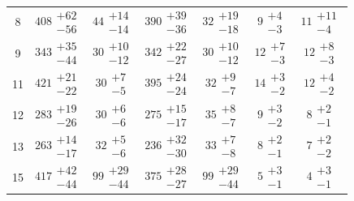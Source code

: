 \begin{table}[htbp!]
\begin{center}
\begin{tabular}{ccccccc}
8 & $ 408 \substack{+ 62 \\ -56 }$ &$ 44 \substack{+ 14 \\- 14 }$ &$ 390 \substack{+ 39 \\- 36 }$ &$ 32 \substack{+ 19 \\- 18 }$ &$ 9 \substack{+ 4 \\- 3 }$ &$ 11 \substack{+ 11 \\- 4 }$ \\
9 & $ 343 \substack{+ 35 \\ -44 }$ &$ 30 \substack{+ 10 \\- 12 }$ &$ 342 \substack{+ 22 \\- 27 }$ &$ 30 \substack{+ 10 \\- 12 }$ &$ 12 \substack{+ 7 \\- 3 }$ &$ 12 \substack{+ 8 \\- 3 }$ \\
11 & $ 421 \substack{+ 21 \\ -22 }$ &$ 30 \substack{+ 7 \\- 5 }$ &$ 395 \substack{+ 24 \\- 24 }$ &$ 32 \substack{+ 9 \\- 7 }$ &$ 14 \substack{+ 3 \\- 2 }$ &$ 12 \substack{+ 4 \\- 2 }$ \\
12 & $ 283 \substack{+ 19 \\ -26 }$ &$ 30 \substack{+ 6 \\- 6 }$ &$ 275 \substack{+ 15 \\- 17 }$ &$ 35 \substack{+ 8 \\- 7 }$ &$ 9 \substack{+ 3 \\- 2 }$ &$ 8 \substack{+ 2 \\- 1 }$ \\
13 & $ 263 \substack{+ 14 \\ -17 }$ &$ 32 \substack{+ 5 \\- 6 }$ &$ 236 \substack{+ 32 \\- 30 }$ &$ 33 \substack{+ 7 \\- 8 }$ &$ 8 \substack{+ 2 \\- 1 }$ &$ 7 \substack{+ 2 \\- 2 }$ \\
15 & $ 417 \substack{+ 42 \\ -44 }$ &$ 99 \substack{+ 29 \\- 44 }$ &$ 375 \substack{+ 28 \\- 27 }$ &$ 99 \substack{+ 29 \\- 44 }$ &$ 5 \substack{+ 3 \\- 1 }$ &$ 4 \substack{+ 3 \\- 1 }$ \\

\end{tabular}
\end{center}
\end{table}
